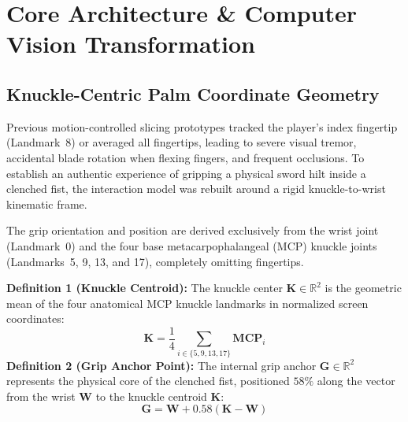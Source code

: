 \documentclass[11pt,a4paper]{article}
\begin{document}
\clearpage

\section{Core Architecture \& Computer Vision Transformation}

\subsection{Knuckle-Centric Palm Coordinate Geometry}
Previous motion-controlled slicing prototypes tracked the player's index fingertip (Landmark~8) or averaged all fingertips, leading to severe visual tremor, accidental blade rotation when flexing fingers, and frequent occlusions. To establish an authentic experience of gripping a physical sword hilt inside a clenched fist, the interaction model was rebuilt around a rigid knuckle-to-wrist kinematic frame.

The grip orientation and position are derived exclusively from the wrist joint (Landmark~0) and the four base metacarpophalangeal (MCP) knuckle joints (Landmarks~5, 9, 13, and 17), completely omitting fingertips.

\begin{FormulaCard}
\textbf{\color{NavyPrimary}Definition 1 (Knuckle Centroid):} The knuckle center $\mathbf{K} \in \mathbb{R}^2$ is the geometric mean of the four anatomical MCP knuckle landmarks in normalized screen coordinates:
{\large
\begin{equation}
\mathbf{K} = \frac{1}{4} \sum_{i \in \{5, 9, 13, 17\}} \mathbf{MCP}_i
\label{eq:knuckle_center}
\end{equation}
}
\vspace{-0.4em}
\textbf{\color{NavyPrimary}Definition 2 (Grip Anchor Point):} The internal grip anchor $\mathbf{G} \in \mathbb{R}^2$ represents the physical core of the clenched fist, positioned $58\%$ along the vector from the wrist $\mathbf{W}$ to the knuckle centroid $\mathbf{K}$:
{\large
\begin{equation}
\mathbf{G} = \mathbf{W} + 0.58\left(\mathbf{K} - \mathbf{W}\right)
\label{eq:grip_anchor}
\end{equation}
}
\end{FormulaCard}
\end{document}
